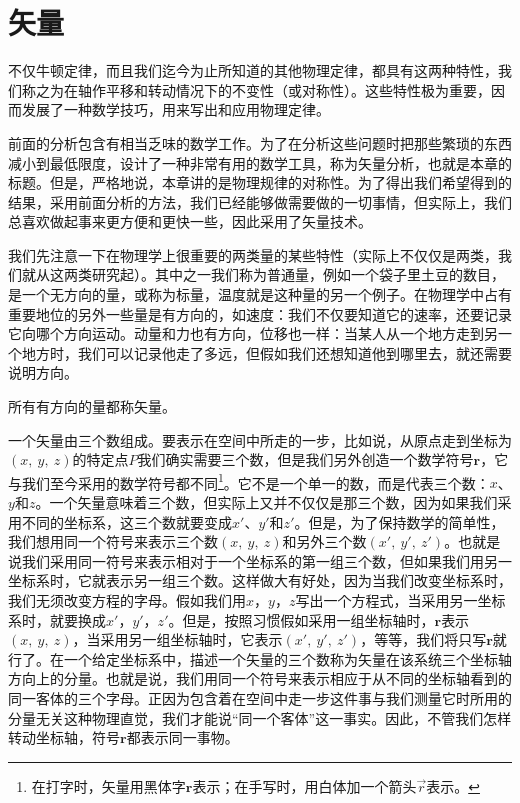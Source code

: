 \section{矢量}

不仅牛顿定律，而且我们迄今为止所知道的其他物理定律，都具有这两种特性，我们称之为在轴作平移和转动情况下的不变性（或对称性）。这些特性极为重要，因而发展了一种数学技巧，用来写出和应用物理定律。

前面的分析包含有相当乏味的数学工作。为了在分析这些问题时把那些繁琐的东西减小到最低限度，设计了一种非常有用的数学工具，称为矢量分析，也就是本章的标题。但是，严格地说，本章讲的是物理规律的对称性。为了得出我们希望得到的结果，采用前面分析的方法，我们已经能够做需要做的一切事情，但实际上，我们总喜欢做起事来更方便和更快一些，因此采用了矢量技术。

我们先注意一下在物理学上很重要的两类量的某些特性（实际上不仅仅是两类，我们就从这两类研究起）。其中之一我们称为普通量，例如一个袋子里土豆的数目，是一个无方向的量，或称为标量，温度就是这种量的另一个例子。在物理学中占有重要地位的另外一些量是有方向的，如速度：我们不仅要知道它的速率，还要记录它向哪个方向运动。动量和力也有方向，位移也一样：当某人从一个地方走到另一个地方时，我们可以记录他走了多远，但假如我们还想知道他到哪里去，就还需要说明方向。

所有有方向的量都称矢量。

一个矢量由三个数组成。要表示在空间中所走的一步，比如说，从原点走到坐标为$(x,~y,~z)$的特定点$P$我们确实需要三个数，但是我们另外创造一个数学符号$\boldsymbol{r}$，它与我们至今采用的数学符号都不同\footnote{在打字时，矢量用黑体字$\boldsymbol{r}$表示；在手写时，用白体加一个箭头$\vec{r}$表示。}。它不是一个单一的数，而是代表三个数：$x$、$y$和$z$。一个矢量意味着三个数，但实际上又并不仅仅是那三个数，因为如果我们采用不同的坐标系，这三个数就要变成$x'$、$y'$和$z'$。但是，为了保持数学的简单性，我们想用同一个符号来表示三个数$(x,~y,~z)$和另外三个数$(x',~y',~z')$。也就是说我们采用同一符号来表示相对于一个坐标系的第一组三个数，但如果我们用另一坐标系时，它就表示另一组三个数。这样做大有好处，因为当我们改变坐标系时，我们无须改变方程的字母。假如我们用$x$，$y$，$z$写出一个方程式，当采用另一坐标系时，就要换成$x'$，$y'$，$z'$。但是，按照习惯假如采用一组坐标轴时，$\boldsymbol{r}$表示$(x,~y,~z)$，当采用另一组坐标轴时，它表示$(x',~y',~z')$，等等，我们将只写$\boldsymbol{r}$就行了。在一个给定坐标系中，描述一个矢量的三个数称为矢量在该系统三个坐标轴方向上的分量。也就是说，我们用同一个符号来表示相应于从不同的坐标轴看到的同一客体的三个字母。正因为包含着在空间中走一步这件事与我们测量它时所用的分量无关这种物理直觉，我们才能说“同一个客体”这一事实。因此，不管我们怎样转动坐标轴，符号$\boldsymbol{r}$都表示同一事物。

